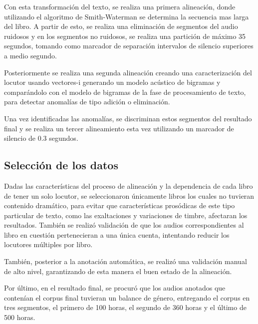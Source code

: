 Con esta transformación del texto, se realiza una primera alineación, donde utilizando el algoritmo de Smith-Waterman \cite{Smite1981IdentificationSubsequences} se determina la secuencia mas larga del libro. A partir de esto, se realiza una eliminación de segmentos del audio ruidosos y en los segmentos no ruidosos, se realiza una partición de máximo 35 segundos, tomando como marcador de separación intervalos de silencio superiores a medio segundo.

Posteriormente se realiza una segunda alineación creando una caracterización del locutor usando vectores-i \cite{Dehak2011} generando un modelo acústico de bigramas y comparándolo con el modelo de bigramas de la fase de procesamiento de texto, para detectar anomalías de tipo adición o eliminación.

Una vez identificadas las anomalías, se discriminan estos segmentos del resultado final y se realiza un tercer alineamiento esta vez utilizando un marcador de silencio de 0.3 segundos.

\subsection{Selección de los datos}

Dadas las características del proceso de alineación y la dependencia de cada libro de tener un solo locutor, se seleccionaron únicamente libros los cuales no tuvieran contenido dramático, para evitar que características prosódicas de este tipo particular de texto, como las exaltaciones y variaciones de timbre, afectaran los resultados. También se realizó validación de que los audios correspondientes al libro en cuestión pertenecieran a una única cuenta, intentando reducir los locutores múltiples por libro.

También, posterior a la anotación automática, se realizó una validación manual de alto nivel, garantizando de esta manera el buen estado de la alineación.

Por último, en el resultado final, se procuró que los audios anotados que contenían el corpus final tuvieran un balance de género, entregando el corpus en tres segmentos, el primero de 100 horas, el segundo de 360 horas y el último de 500 horas.